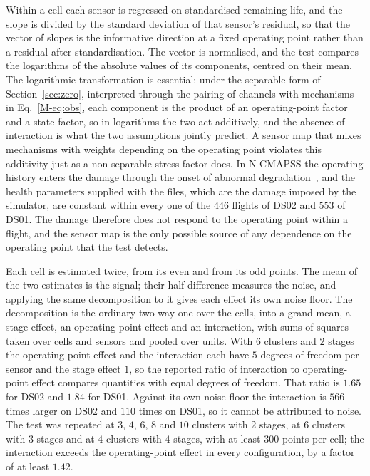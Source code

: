 \documentclass[12pt]{article}
\begin{document}
Within a cell each sensor is regressed on standardised remaining life, and
the slope is divided by the standard deviation of that sensor's residual, so
that the vector of slopes is the informative direction at a fixed operating
point rather than a residual after standardisation. The vector is normalised,
and the test compares the logarithms of the absolute values of its
components, centred on their mean. The logarithmic transformation is
essential: under the separable form of Section~\ref{sec:zero}, interpreted
through the pairing of channels with mechanisms in Eq.~\eqref{M-eq:obs}, each
component is the product of an operating-point factor and a state factor, so
in logarithms the two act additively, and the absence of interaction is what
the two assumptions jointly predict. A sensor map that mixes mechanisms with
weights depending on the operating point violates this additivity just as a
non-separable stress factor does. In N-CMAPSS the operating history enters
the damage through the onset of abnormal
degradation~\cite{arias2022fusing}, and the health parameters supplied with
the files, which are the damage imposed by the simulator, are constant within
every one of the $446$ flights of DS02 and $553$ of DS01. The damage
therefore does not respond to the operating point within a flight, and the
sensor map is the only possible source of any dependence on the operating
point that the test detects.

Each cell is estimated twice, from its even and from its odd points. The mean
of the two estimates is the signal; their half-difference measures the
noise, and applying the same decomposition to it gives each effect its own
noise floor. The decomposition is the ordinary two-way one over the cells,
into a grand mean, a stage effect, an operating-point effect and an
interaction, with sums of squares taken over cells and sensors and pooled
over units. With $6$ clusters and $2$ stages the operating-point effect and
the interaction each have $5$ degrees of freedom per sensor and the stage
effect $1$, so the reported ratio of interaction to operating-point effect
compares quantities with equal degrees of freedom. That ratio is $1.65$ for
DS02 and $1.84$ for DS01. Against its own noise floor the interaction is $566$ times larger on DS02
and $110$ times on DS01, so it cannot be attributed to noise. The test was
repeated at $3$, $4$, $6$, $8$ and $10$ clusters with $2$ stages, at $6$
clusters with $3$ stages and at $4$ clusters with $4$ stages, with at least
$300$ points per cell; the interaction exceeds the operating-point effect in
every configuration, by a factor of at least $1.42$.
\end{document}
